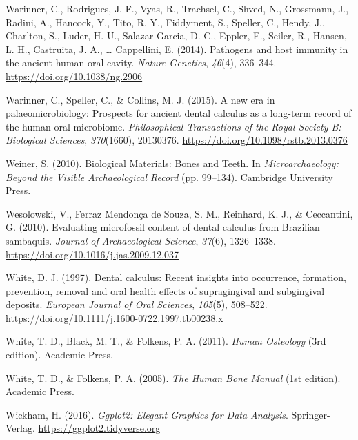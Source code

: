 \documentclass[
  letterpaper,
]{book}
\newlength{\cslhangindent}
\newlength{\cslentryspacingunit} %
\newenvironment{CSLReferences}[2] %
 {%
  \setlength{\parindent}{0pt}
  \ifodd #1
  \let\oldpar\par
  \def\par{\hangindent=\cslhangindent\oldpar}
  \fi
  \setlength{\parskip}{#2\cslentryspacingunit}
 }%
 {}
\begin{document}
\begin{CSLReferences}{1}{0}
\leavevmode{}%
Warinner, C., Rodrigues, J. F., Vyas, R., Trachsel, C., Shved, N.,
Grossmann, J., Radini, A., Hancock, Y., Tito, R. Y., Fiddyment, S.,
Speller, C., Hendy, J., Charlton, S., Luder, H. U., Salazar-Garcia, D.
C., Eppler, E., Seiler, R., Hansen, L. H., Castruita, J. A., \ldots{}
Cappellini, E. (2014). Pathogens and host immunity in the ancient human
oral cavity. \emph{Nature Genetics}, \emph{46}(4), 336--344.
\url{https://doi.org/10.1038/ng.2906}

\leavevmode{}%
Warinner, C., Speller, C., \& Collins, M. J. (2015). A new era in
palaeomicrobiology: Prospects for ancient dental calculus as a long-term
record of the human oral microbiome. \emph{Philosophical Transactions of
the Royal Society B: Biological Sciences}, \emph{370}(1660), 20130376.
\url{https://doi.org/10.1098/rstb.2013.0376}

\leavevmode{}%
Weiner, S. (2010). Biological {Materials}: {Bones} and {Teeth}. In
\emph{Microarchaeology: {Beyond} the {Visible Archaeological Record}}
(pp. 99--134). {Cambridge University Press}.

\leavevmode{}%
Wesolowski, V., Ferraz Mendonça de Souza, S. M., Reinhard, K. J., \&
Ceccantini, G. (2010). Evaluating microfossil content of dental calculus
from {Brazilian} sambaquis. \emph{Journal of Archaeological Science},
\emph{37}(6), 1326--1338.
\url{https://doi.org/10.1016/j.jas.2009.12.037}

\leavevmode{}%
White, D. J. (1997). Dental calculus: Recent insights into occurrence,
formation, prevention, removal and oral health effects of supragingival
and subgingival deposits. \emph{European Journal of Oral Sciences},
\emph{105}(5), 508--522.
\url{https://doi.org/10.1111/j.1600-0722.1997.tb00238.x}

\leavevmode{}%
White, T. D., Black, M. T., \& Folkens, P. A. (2011). \emph{Human
{Osteology}} (3rd edition). {Academic Press}.

\leavevmode{}%
White, T. D., \& Folkens, P. A. (2005). \emph{The {Human Bone Manual}}
(1st edition). {Academic Press}.

\leavevmode{}%
Wickham, H. (2016). \emph{Ggplot2: {Elegant Graphics} for {Data
Analysis}}. {Springer-Verlag}. \url{https://ggplot2.tidyverse.org}


\end{CSLReferences}
\end{document}
